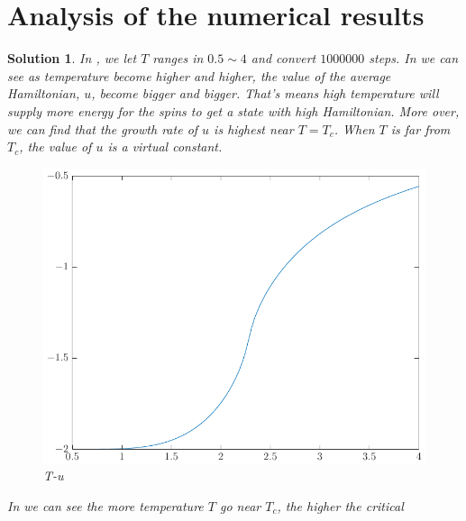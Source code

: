 \documentclass[11pt,openany]{book}              %
\newtheorem{solution}{Solution}
\begin{document}
\section{Analysis of the numerical results }
\begin{solution}
	In , we let \(T\) ranges in \(0.5\sim 4\) and convert \(1000000\) steps.
	In  we can see as temperature become higher and higher, the value of the average Hamiltonian, \(u\), become bigger and bigger.
	That's means high temperature will supply more energy for the spins to get a state with high Hamiltonian.
	More over, we can find that the growth rate of \(u\) is highest near \(T=T_c\).
	When \(T\) is far from \(T_c\), the value of \(u\) is a virtual constant.
	\begin{figure}\label{fig:Tu}
		\centering
		\includegraphics[width=0.8\linewidth]{Tu.pdf}
		\caption{T-u}
	\end{figure}
	In  we can see the more temperature \(T\) go near \(T_c\), the higher the critical


\end{solution}
\end{document}
